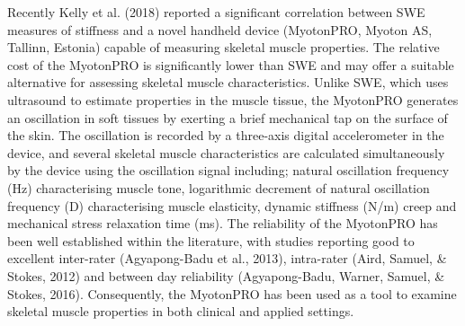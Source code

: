 \documentclass[man,floatsintext]{apa6}
\begin{document}
Recently Kelly et al. (2018) reported a significant correlation between SWE measures of stiffness and a novel handheld device (MyotonPRO, Myoton AS, Tallinn, Estonia) capable of measuring skeletal muscle properties.
The relative cost of the MyotonPRO is significantly lower than SWE and may offer a suitable alternative for assessing skeletal muscle characteristics.
Unlike SWE, which uses ultrasound to estimate properties in the muscle tissue, the MyotonPRO generates an oscillation in soft tissues by exerting a brief mechanical tap on the surface of the skin.
The oscillation is recorded by a three-axis digital accelerometer in the device, and several skeletal muscle characteristics are calculated simultaneously by the device using the oscillation signal including;
natural oscillation frequency (Hz) characterising muscle tone,
logarithmic decrement of natural oscillation frequency (D) characterising muscle elasticity, dynamic stiffness (N/m)
creep and
mechanical stress relaxation time (ms).
The reliability of the MyotonPRO has been well established within the literature, with studies reporting good to excellent inter-rater (Agyapong-Badu et al., 2013), intra-rater (Aird, Samuel, \& Stokes, 2012) and between day reliability (Agyapong-Badu, Warner, Samuel, \& Stokes, 2016).
Consequently, the MyotonPRO has been used as a tool to examine skeletal muscle properties in both clinical and applied settings.
\end{document}
